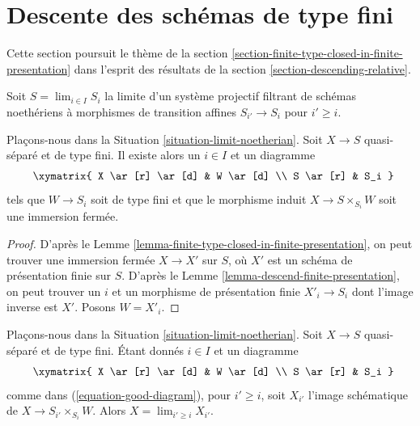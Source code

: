 \section{Descente des schémas de type fini}
\label{section-finite-type-quasi-separated}

\noindent
Cette section poursuit le thème de la
section \ref{section-finite-type-closed-in-finite-presentation}
dans l'esprit des résultats de la
section \ref{section-descending-relative}.

\begin{situation}
\label{situation-limit-noetherian}
Soit $S = \lim_{i \in I} S_i$ la limite d'un système projectif filtrant de
schémas noethériens à morphismes de transition affines $S_{i'} \to S_i$
pour $i' \geq i$.
\end{situation}

\begin{lemma}
\label{lemma-good-diagram}
Plaçons-nous dans la Situation \ref{situation-limit-noetherian}.
Soit $X \to S$ quasi-séparé et de type fini.
Il existe alors un $i \in I$ et un diagramme
\begin{equation}
\label{equation-good-diagram}
\vcenter{
\xymatrix{
X \ar[r] \ar[d] & W \ar[d] \\
S \ar[r] & S_i
}
}
\end{equation}
tels que $W \to S_i$ soit de type fini et que
le morphisme induit $X \to S \times_{S_i} W$ soit une immersion
fermée.
\end{lemma}

\begin{proof}
D'après le Lemme \ref{lemma-finite-type-closed-in-finite-presentation},
on peut trouver une immersion fermée $X \to X'$
sur $S$, où $X'$ est un schéma de présentation finie sur $S$.
D'après le Lemme \ref{lemma-descend-finite-presentation},
on peut trouver un $i$ et un morphisme de présentation finie
$X'_i \to S_i$ dont l'image inverse est $X'$. Posons $W = X'_i$.
\end{proof}

\begin{lemma}
\label{lemma-limit-from-good-diagram}
Plaçons-nous dans la Situation \ref{situation-limit-noetherian}.
Soit $X \to S$ quasi-séparé et de type fini.
Étant donnés $i \in I$ et un diagramme
$$
\vcenter{
\xymatrix{
X \ar[r] \ar[d] & W \ar[d] \\
S \ar[r] & S_i
}
}
$$
comme dans (\ref{equation-good-diagram}), pour $i' \geq i$, soit
$X_{i'}$ l'image schématique de $X \to S_{i'} \times_{S_i} W$.
Alors $X = \lim_{i' \geq i} X_{i'}$.
\end{lemma}

